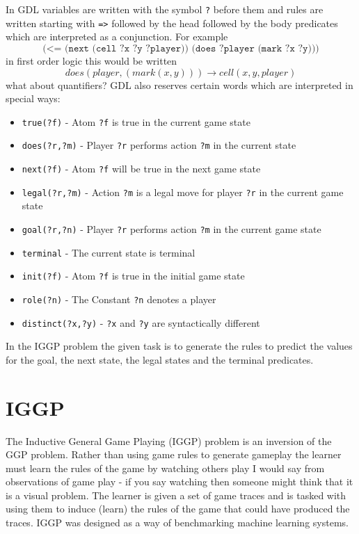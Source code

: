 In GDL variables are written with the symbol \texttt{?} before them and rules are written starting with \verb|=>| followed by the head followed by the body predicates which are interpreted as a conjunction. For example \[\texttt{(<= (next (cell ?x ?y ?player)) (does ?player (mark ?x ?y)))}\] in first order logic this would be written \[does(player,(mark(x,y))) \rightarrow cell(x,y,player)\]
\ac{what about quantifiers?}
GDL also reserves certain words which are interpreted in special ways:
\begin{itemize}
	\item \texttt{true(?f)} - Atom \texttt{?f} is true in the current game state
	\item \texttt{does(?r,?m)} - Player \texttt{?r} performs action \texttt{?m} in the current state
	\item \texttt{next(?f)} - Atom \texttt{?f} will be true in the next game state
	\item \texttt{legal(?r,?m)} - Action \texttt{?m} is a legal move for player \texttt{?r} in the current game state
	\item \texttt{goal(?r,?n)} - Player \texttt{?r} performs action \texttt{?m} in the current game state
	\item \texttt{terminal} - The current state is terminal
	\item \texttt{init(?f)} - Atom \texttt{?f} is true in the initial game state
	\item \texttt{role(?n)} - The Constant \texttt{?n} denotes a player
	\item \texttt{distinct(?x,?y)} - \texttt{?x} and \texttt{?y} are syntactically different
\end{itemize}
In the IGGP problem the given task is to generate the rules to predict the values for the goal, the next state, the legal states and the terminal predicates.



\section{IGGP}
The Inductive General Game Playing (IGGP) problem is an inversion of the GGP problem. Rather than using game rules to generate gameplay the learner must learn the rules of the game by watching others play \ac{I would say from observations of game play - if you say watching then someone might think that it is a visual problem}. The learner is given a set of game traces and is tasked with using them to induce (learn) the rules of the game that could have produced the traces\cite{Cropper/IGGP}. IGGP was designed as a way of benchmarking machine learning systems.

